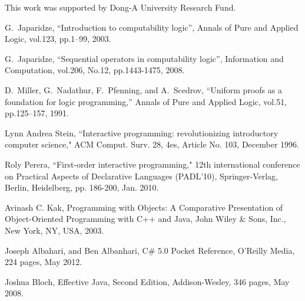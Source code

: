 \documentclass[letter]{ieice}
\begin{document}
This work  was supported by Dong-A University Research Fund.


\begin{thebibliography}{1}


G.~Japaridze, ``Introduction to computability logic'', Annals  of Pure and
 Applied  Logic, vol.123, pp.1--99, 2003.

G.~Japaridze,   ``Sequential operators in computability logic'',
 Information and Computation, vol.206, No.12, pp.1443-1475, 2008.

D.~Miller, G.~Nadathur, F.~Pfenning, and A.~Scedrov, ``Uniform proofs as a
  foundation for logic programming,'' Annals of Pure and Applied Logic, vol.51,
  pp.125--157, 1991.

Lynn Andrea Stein, ``Interactive programming: revolutionizing introductory computer science," ACM Comput. Surv. 28, 4es, Article No. 103, December 1996.

Roly Perera, ``First-order interactive programming," 12th international conference on Practical Aspects of Declarative Languages (PADL'10),
Springer-Verlag, Berlin, Heidelberg, pp. 186-200, Jan. 2010.

Avinash C. Kak, Programming with Objects: A Comparative Presentation of Object-Oriented Programming with C++ and Java,
John Wiley \& Sons, Inc., New York, NY, USA, 2003.

Joseph Albahari, and Ben Albanhari, C\# 5.0 Pocket Reference, O'Reilly Media, 224 pages, May 2012.

Joshua Bloch, Effective Java, Second Edition, Addison-Wesley, 346 pages, May 2008.

\end{thebibliography}
\end{document}
